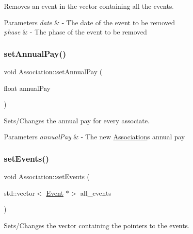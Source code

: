 Removes an event in the vector containing all the events. 


\begin{DoxyParams}{Parameters}
{\em date} & -\/ The date of the event to be removed \\
\hline
{\em phase} & -\/ The phase of the event to be removed \\
\hline
\end{DoxyParams}
\mbox{\label{classAssociation_a4279bd391a3110e4110d3f300b3423a3}} 
\subsubsection{\texorpdfstring{set\+Annual\+Pay()}{setAnnualPay()}}
{\footnotesize\ttfamily void Association\+::set\+Annual\+Pay (\begin{DoxyParamCaption}\item[{float}]{annual\+Pay }\end{DoxyParamCaption})}



Sets/\+Changes the annual pay for every associate. 


\begin{DoxyParams}{Parameters}
{\em annual\+Pay} & -\/ The new \mbox{\hyperlink{classAssociation}{Association}}\textquotesingle{}s annual pay \\
\hline
\end{DoxyParams}
\mbox{\label{classAssociation_a5611bc364e24e70f110332d1b2c63a08}} 
\subsubsection{\texorpdfstring{set\+Events()}{setEvents()}}
{\footnotesize\ttfamily void Association\+::set\+Events (\begin{DoxyParamCaption}\item[{std\+::vector$<$ \mbox{\hyperlink{classEvent}{Event}} $\ast$$>$}]{all\+\_\+events }\end{DoxyParamCaption})}



Sets/\+Changes the vector containing the pointers to the events. 


